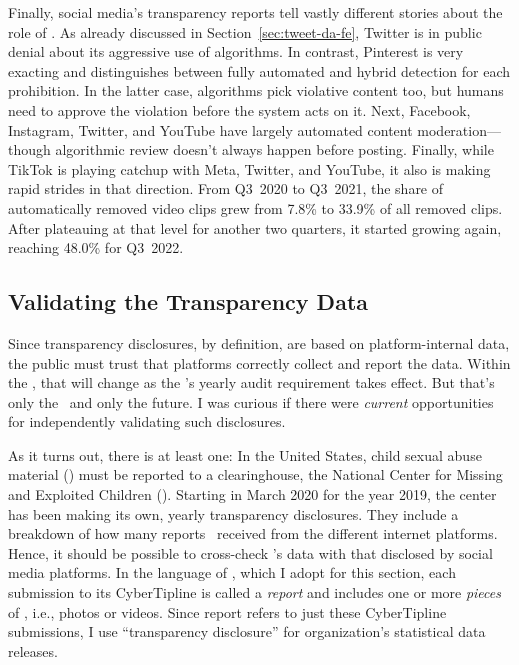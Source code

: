 Finally, social media's transparency reports tell vastly different stories about
the role of \AI. As already discussed in Section~\ref{sec:tweet-da-fe}, Twitter
is in public denial about its aggressive use of algorithms. In contrast,
Pinterest is very exacting and distinguishes between fully automated and hybrid
detection for each prohibition. In the latter case, algorithms pick violative
content too, but humans need to approve the violation before the system acts on
it. Next, Facebook, Instagram, Twitter, and YouTube have largely automated
content moderation---though algorithmic review doesn't always happen before
posting. Finally, while TikTok is playing catchup with Meta, Twitter, and
YouTube, it also is making rapid strides in that direction. From Q3~2020 to
Q3~2021, the share of automatically removed video clips grew from 7.8\% to
33.9\% of all removed clips. After plateauing at that level for another two
quarters, it started growing again, reaching 48.0\% for Q3~2022.


\subsection{Validating the Transparency Data}
\label{sec:census-validation}

Since transparency disclosures, by definition, are based on platform-internal
data, the public must trust that platforms correctly collect and report the
data. Within the \EU, that will change as the \DSA's yearly audit requirement
takes effect. But that's only the \EU\ and only the future. I was curious if
there were \emph{current} opportunities for independently validating such
disclosures.

As it turns out, there is at least one: In the United States, child sexual abuse
material (\CSAM) must be reported to a clearinghouse, the National Center for
Missing and Exploited Children (\NCMEC). Starting in March 2020 for the year
2019, the center has been making its own, yearly transparency disclosures. They
include a breakdown of how many reports \NCMEC\ received from the different
internet platforms. Hence, it should be possible to cross-check \NCMEC's data
with that disclosed by social media platforms. In the language of \NCMEC, which
I adopt for this section, each submission to its CyberTipline is called a
\emph{report} and includes one or more \emph{pieces} of \CSAM, i.e., photos or
videos. Since report refers to just these CyberTipline submissions, I use
``transparency disclosure'' for organization's statistical data releases.

